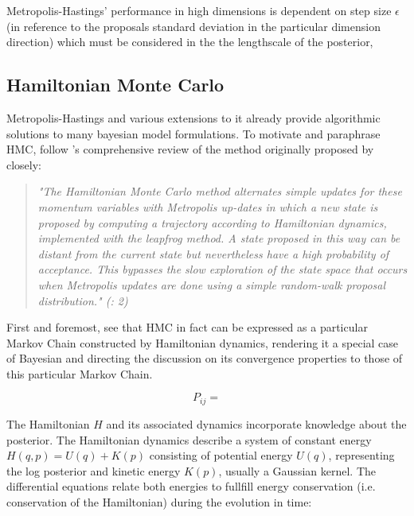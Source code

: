 \documentclass[11pt]{article}
\begin{document}
        \cite{mackay2003information} Metropolis-Hastings' performance in high dimensions is dependent on step size $\epsilon$ (in reference to the proposals standard deviation in the particular dimension direction) which must be considered in the the lengthscale of the posterior,  %




        \subsection{Hamiltonian Monte Carlo}
        Metropolis-Hastings and various extensions to it already provide algorithmic solutions to many bayesian model formulations.
        To motivate and paraphrase HMC, follow  \cite{neal2011mcmc}'s comprehensive review of the method originally proposed by %
        closely:

        \begin{quote}
            \it{"The Hamiltonian Monte Carlo method alternates simple updates for these momentum variables with Metropolis up-dates in which a new state is proposed by computing a trajectory according to Hamiltonian dynamics, implemented with the leapfrog method. A state proposed in this way can be distant from the current state but nevertheless have a high probability of acceptance. This bypasses the slow exploration of the state space that occurs when Metropolis updates are done using a simple random-walk proposal distribution."}   \normalfont     (\cite{neal2011mcmc}: 2)
        \end{quote}

        First and foremost, see that HMC in fact can be expressed as a particular Markov Chain constructed by Hamiltonian dynamics, rendering it a special case of Bayesian and directing the discussion on its convergence properties to those of this particular Markov Chain.

        \begin{equation}
            P_{ij} =
        \end{equation} %

        The Hamiltonian $H$ and its associated dynamics incorporate knowledge about the posterior. The Hamiltonian dynamics describe a system of constant energy $H(q,p) = U(q) + K(p)$ consisting of potential energy $U(q)$, representing the log posterior and kinetic energy $K(p)$, usually a Gaussian kernel. The differential equations relate both energies to fullfill energy conservation (i.e. conservation of the Hamiltonian) during the evolution in time:
\end{document}
